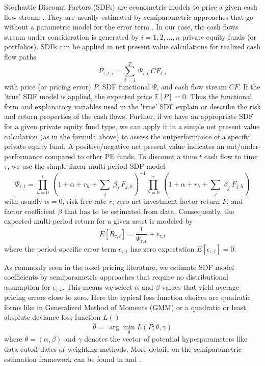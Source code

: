 \documentclass[12pt]{article}
\begin{document}
Stochastic Discount Factors (SDFs) are econometric models to price a given cash flow stream \citep{HR87}.
They are usually estimated by semiparametric approaches that go without a parametric model for the error term \citep{F19}.
In our case, the cash flows stream under consideration is generated by $i=1,2,\dots,n$ private equity funds (or portfolios).
SDFs can be applied in net present value calculations for realized cash flow paths
\begin{equation}
\label{eq:pricing_error}
P_{\tau, t, i} =
\sum_{t=1}^{T}\ \Psi_{\tau, t}\ {CF}_{t, i}
\end{equation}
with price (or pricing error) $P$, SDF functional $\Psi$, and cash flow stream $CF$. 
If the 'true' SDF model is applied, the expected price $\mathbb{E}[P]=0$. 
Thus the functional form and explanatory variables used in the 'true' SDF explain or describe the risk and return properties of the cash flows. 
Further, if we have an appropriate SDF for a given private equity fund type, we can apply it in a simple net present value calculation (as in the formula above) to assess the outperformance of a specific private equity fund. 
A positive/negative net present value indicates an out/under-performance compared to other PE funds.
To discount a time $t$ cash flow to time $\tau$, we use the simple linear multi-period SDF model
\begin{equation}
\label{eq:linear_sdf}
\Psi_{\tau,t} =
\prod_{h=0}^{t}\ \left(1+ \alpha + r_{h} + \sum_j\ \beta_j\ F_{j,h} \right)^{-1}
\prod_{h=0}^{\tau}\ \left(1 + \alpha + r_{h} + \sum_j\ \beta_j\ F_{j,h} \right)
\end{equation}
with usually $\alpha=0$, risk-free rate $r$, zero-net-investment factor return $F$, and factor coefficient $\beta$ that has to be estimated from data. 
Consequently, the expected multi-period return for a given asset is modeled by
\[
E \left[R_{\tau,t} \right] = \frac{1}{\Psi_{\tau,t}} + \epsilon_{\tau,t}
\]
where the period-specific error term $\epsilon_{\tau,t}$ has zero expectation $E[\epsilon_{\tau,t}]=0$.

As commonly seen in the asset pricing literature, we estimate SDF model coefficients by semiparametric approaches that require no distributional assumption for $\epsilon_{\tau,t}$.
This means we select $\alpha$ and $\beta$ values that yield average pricing errors close to zero. 
Here the typical loss function choices are quadratic forms like in Generalized Method of Moments (GMM) or a quadratic or least absolute deviance loss function $L()$
\begin{equation}
\label{eq:elastic_net}
\hat{\theta } = \
\arg \min_{\theta} L \left( P ; \theta, \gamma \right)
\end{equation}
where $\theta=(\alpha,\beta)$ and $\gamma$ denotes the vector of potential hyperparameters like data cutoff dates or weighting methods.
More details on the semiparametric estimation framework can be found in \cite{DLP12} and \cite{T20}.
\end{document}
